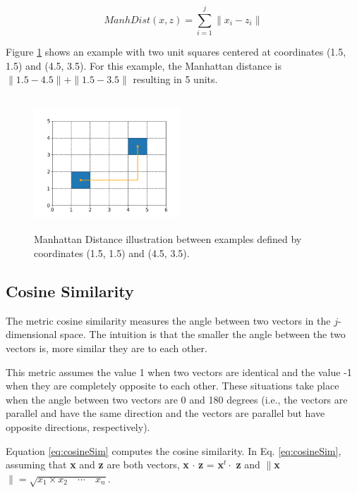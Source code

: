 \begin{equation}
    ManhDist(x,z) = \sum_{i=1}^{j} \|x_{i} - z_{i}\| 
    \label{eq:manDistance}
\end{equation}


Figure \ref{fig:manDistance} shows an example with two unit squares centered at coordinates (1.5, 1.5) and (4.5, 3.5). For this example, the Manhattan distance is $\|1.5 - 4.5\| + \|1.5 - 3.5\|$ resulting in 5 units.
 
\begin{figure}[h]
    \centering
    \includegraphics[height = 5cm, width =  5.5cm]{figures/manhattanDistance.png}
    \caption{Manhattan Distance illustration between examples defined by coordinates (1.5, 1.5) and (4.5, 3.5).}
    \label{fig:manDistance}
\end{figure}

\subsection{Cosine Similarity}

The metric cosine similarity \cite{han2012mining} measures the angle between two vectors in the $j$-dimensional space. The intuition is that the smaller the angle between the two vectors is, more similar they are to each other.

This metric assumes the value 1 when two vectors are identical and the value -1 when they are completely opposite to each other. These situations take place when the angle between two vectors are 0 and 180 degrees (i.e., the vectors are parallel and have the same direction and the vectors are parallel but have opposite directions, respectively).

Equation \ref{eq:cosineSim} computes the cosine similarity. In Eq. \ref{eq:cosineSim}, assuming that \textbf{x} and \textbf{z} are both vectors, \textbf{x} $\cdot$ \textbf{z} = \textbf{x}$^t \cdot$ \textbf{z} and $\|$\textbf{x}$\| = \sqrt{x_1 \times x_2 \quad \cdots \quad x_n}$.

